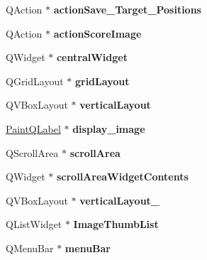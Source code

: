 \begin{DoxyCompactItemize}
Q\+Action $\ast$ {\bfseries action\+Save\+\_\+\+Target\+\_\+\+Positions}
\item 
\mbox{\label{class_ui___main_window_a359a1e125f0da2e999911516e80b298b}} 
Q\+Action $\ast$ {\bfseries action\+Score\+Image}
\item 
\mbox{\label{class_ui___main_window_a30075506c2116c3ed4ff25e07ae75f81}} 
Q\+Widget $\ast$ {\bfseries central\+Widget}
\item 
\mbox{\label{class_ui___main_window_a525ed3c5fe0784ac502ee222fba4e205}} 
Q\+Grid\+Layout $\ast$ {\bfseries grid\+Layout}
\item 
\mbox{\label{class_ui___main_window_aecd96a04789fcfec3f98d80390ad8184}} 
Q\+V\+Box\+Layout $\ast$ {\bfseries vertical\+Layout}
\item 
\mbox{\label{class_ui___main_window_afcbad21c4f3f1ea6942bdee2975b33b0}} 
\hyperlink{class_paint_q_label}{Paint\+Q\+Label} $\ast$ {\bfseries display\+\_\+image}
\item 
\mbox{\label{class_ui___main_window_ac5779d53b47a565785fec252abb1b3c6}} 
Q\+Scroll\+Area $\ast$ {\bfseries scroll\+Area}
\item 
\mbox{\label{class_ui___main_window_aa70fc2af9f9ea3b686db12823c5deb47}} 
Q\+Widget $\ast$ {\bfseries scroll\+Area\+Widget\+Contents}
\item 
\mbox{\label{class_ui___main_window_a0c01bad60d9f422a1258e710635a2f65}} 
Q\+V\+Box\+Layout $\ast$ {\bfseries vertical\+Layout\+\_}
\item 
\mbox{\label{class_ui___main_window_a9dfc5b5c2d358ca5cc20f08ddb34730d}} 
Q\+List\+Widget $\ast$ {\bfseries Image\+Thumb\+List}
\item 
\mbox{\label{class_ui___main_window_a2be1c24ec9adfca18e1dcc951931457f}} 
Q\+Menu\+Bar $\ast$ {\bfseries menu\+Bar}
\item 
\mbox{\label{class_ui___main_window_a6d6a92a6bccde97ab13fce9014eb25d4}} 

\end{DoxyCompactItemize}
